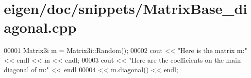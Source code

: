 \hypertarget{eigen_2doc_2snippets_2_matrix_base__diagonal_8cpp_source}{}\section{eigen/doc/snippets/\+Matrix\+Base\+\_\+diagonal.cpp}
\label{eigen_2doc_2snippets_2_matrix_base__diagonal_8cpp_source}

\begin{DoxyCode}
00001 Matrix3i m = Matrix3i::Random();
00002 cout << \textcolor{stringliteral}{"Here is the matrix m:"} << endl << m << endl;
00003 cout << \textcolor{stringliteral}{"Here are the coefficients on the main diagonal of m:"} << endl
00004      << m.diagonal() << endl;
\end{DoxyCode}
